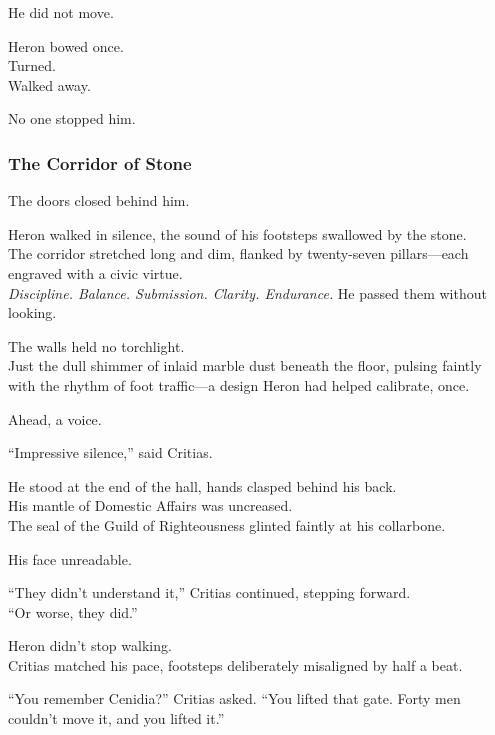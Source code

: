 \documentclass[12pt]{article}
\begin{document}
He did not move.

\vspace{1em}

Heron bowed once.\\
Turned.\\
Walked away.

No one stopped him.

\dotfill

\subsubsection{The Corridor of Stone}

The doors closed behind him.

Heron walked in silence, the sound of his footsteps swallowed by the stone.\\
The corridor stretched long and dim, flanked by twenty-seven pillars—each engraved with a civic virtue.\\
\textit{Discipline. Balance. Submission. Clarity. Endurance.}  
He passed them without looking.

The walls held no torchlight.\\
Just the dull shimmer of inlaid marble dust beneath the floor, pulsing faintly with the rhythm of foot traffic—a design Heron had helped calibrate, once.

Ahead, a voice.

\vspace{1em}

“Impressive silence,” said Critias.

He stood at the end of the hall, hands clasped behind his back.\\
His mantle of Domestic Affairs was uncreased.\\
The seal of the Guild of Righteousness glinted faintly at his collarbone.

His face unreadable.

\vspace{1em}

“They didn’t understand it,” Critias continued, stepping forward.\\
“Or worse, they did.”

Heron didn’t stop walking.\\
Critias matched his pace, footsteps deliberately misaligned by half a beat.

\vspace{1em}

“You remember Cenidia?” Critias asked.  
“You lifted that gate. Forty men couldn’t move it, and you lifted it.”
\end{document}

